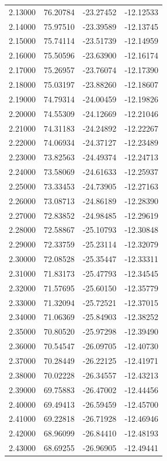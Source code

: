 \begin{table}
\begin{tabular}{llll}
2.13000 & 76.20784 & -23.27452 & -12.12533 \\
2.14000 & 75.97510 & -23.39589 & -12.13745 \\
2.15000 & 75.74114 & -23.51739 & -12.14959 \\
2.16000 & 75.50596 & -23.63900 & -12.16174 \\
2.17000 & 75.26957 & -23.76074 & -12.17390 \\
2.18000 & 75.03197 & -23.88260 & -12.18607 \\
2.19000 & 74.79314 & -24.00459 & -12.19826 \\
2.20000 & 74.55309 & -24.12669 & -12.21046 \\
2.21000 & 74.31183 & -24.24892 & -12.22267 \\
2.22000 & 74.06934 & -24.37127 & -12.23489 \\
2.23000 & 73.82563 & -24.49374 & -12.24713 \\
2.24000 & 73.58069 & -24.61633 & -12.25937 \\
2.25000 & 73.33453 & -24.73905 & -12.27163 \\
2.26000 & 73.08713 & -24.86189 & -12.28390 \\
2.27000 & 72.83852 & -24.98485 & -12.29619 \\
2.28000 & 72.58867 & -25.10793 & -12.30848 \\
2.29000 & 72.33759 & -25.23114 & -12.32079 \\
2.30000 & 72.08528 & -25.35447 & -12.33311 \\
2.31000 & 71.83173 & -25.47793 & -12.34545 \\
2.32000 & 71.57695 & -25.60150 & -12.35779 \\
2.33000 & 71.32094 & -25.72521 & -12.37015 \\
2.34000 & 71.06369 & -25.84903 & -12.38252 \\
2.35000 & 70.80520 & -25.97298 & -12.39490 \\
2.36000 & 70.54547 & -26.09705 & -12.40730 \\
2.37000 & 70.28449 & -26.22125 & -12.41971 \\
2.38000 & 70.02228 & -26.34557 & -12.43213 \\
2.39000 & 69.75883 & -26.47002 & -12.44456 \\
2.40000 & 69.49413 & -26.59459 & -12.45700 \\
2.41000 & 69.22818 & -26.71928 & -12.46946 \\
2.42000 & 68.96099 & -26.84410 & -12.48193 \\
2.43000 & 68.69255 & -26.96905 & -12.49441 \\

\end{tabular}
\end{table}
